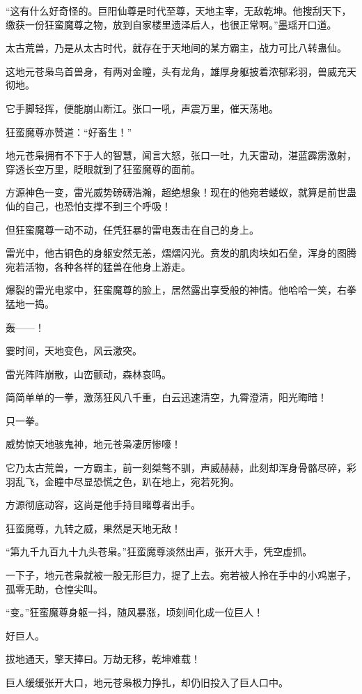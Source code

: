\begin{this_body}
“这有什么好奇怪的。巨阳仙尊是时代至尊，天地主宰，无敌乾坤。他搜刮天下，缴获一份狂蛮魔尊之物，放到自家楼里遗泽后人，也很正常啊。”墨瑶开口道。

太古荒兽，乃是从太古时代，就存在于天地间的某方霸主，战力可比八转蛊仙。

这地元苍枭鸟首兽身，有两对金瞳，头有龙角，雄厚身躯披着浓郁彩羽，兽威充天彻地。

它手脚轻挥，便能崩山断江。张口一吼，声震万里，催天荡地。

狂蛮魔尊亦赞道：“好畜生！”

地元苍枭拥有不下于人的智慧，闻言大怒，张口一吐，九天雷动，湛蓝霹雳激射，穿透长空万里，眨眼就到了狂蛮魔尊的面前。

方源神色一变，雷光威势磅礴浩瀚，超绝想象！现在的他宛若蝼蚁，就算是前世蛊仙的自己，也恐怕支撑不到三个呼吸！

但狂蛮魔尊一动不动，任凭狂暴的雷电轰击在自己的身上。

雷光中，他古铜色的身躯安然无恙，熠熠闪光。贲发的肌肉块如石垒，浑身的图腾宛若活物，各种各样的猛兽在他身上游走。

爆裂的雷光电浆中，狂蛮魔尊的脸上，居然露出享受般的神情。他哈哈一笑，右拳猛地一捣。

轰——！

霎时间，天地变色，风云激突。

雷光阵阵崩散，山峦颤动，森林哀鸣。

简简单单的一拳，激荡狂风八千重，白云迅速清空，九霄澄清，阳光晦暗！

只一拳。

威势惊天地骇鬼神，地元苍枭凄厉惨嚎！

它乃太古荒兽，一方霸主，前一刻桀骜不驯，声威赫赫，此刻却浑身骨骼尽碎，彩羽乱飞，金瞳中尽显恐慌之色，趴在地上，宛若死狗。

方源彻底动容，这尚是他手持目睹尊者出手。

狂蛮魔尊，九转之威，果然是天地无敌！

“第九千九百九十九头苍枭。”狂蛮魔尊淡然出声，张开大手，凭空虚抓。

一下子，地元苍枭就被一股无形巨力，提了上去。宛若被人拎在手中的小鸡崽子，孤零无助，仓惶尖叫。

“变。”狂蛮魔尊身躯一抖，随风暴涨，顷刻间化成一位巨人！

好巨人。

拔地通天，擎天捧曰。万劫无移，乾坤难载！

巨人缓缓张开大口，地元苍枭极力挣扎，却仍旧投入了巨人口中。


\end{this_body}
